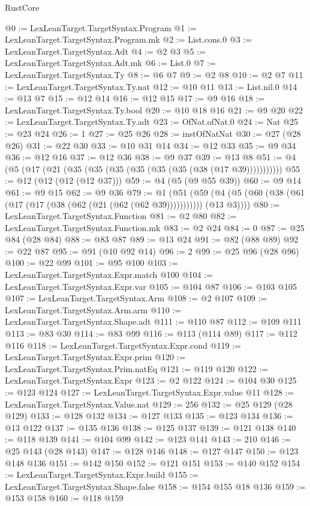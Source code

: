 \begin{lexlean}{RustCore}
\begin{coremodule}
@0 := LexLeanTarget.TargetSyntax.Program
@1 := LexLeanTarget.TargetSyntax.Program.mk
@2 := List.cons.{0}
@3 := LexLeanTarget.TargetSyntax.Adt
@4 := @2 @3
@5 := LexLeanTarget.TargetSyntax.Adt.mk
@6 := List.{0}
@7 := LexLeanTarget.TargetSyntax.Ty
@8 := @6 @7
@9 := @2 @8
@10 := @2 @7
@11 := LexLeanTarget.TargetSyntax.Ty.nat
@12 := @10 @11
@13 := List.nil.{0}
@14 := @13 @7
@15 := @12 @14
@16 := @12 @15
@17 := @9 @16
@18 := LexLeanTarget.TargetSyntax.Ty.bool
@20 := @10 @18 @16
@21 := @9 @20
@22 := LexLeanTarget.TargetSyntax.Ty.adt
@23 := OfNat.ofNat.{0}
@24 := Nat
@25 := @23 @24
@26 := 1
@27 := @25 @26
@28 := instOfNatNat
@30 := @27 (@28 @26)
@31 := @22 @30
@33 := @10 @31 @14
@34 := @12 @33
@35 := @9 @34
@36 := @12 @16
@37 := @12 @36
@38 := @9 @37
@39 := @13 @8
@51 := @4 (@5 (@17 (@21 (@35 (@35 (@35 (@35 (@35 (@35 (@38 (@17 @39)))))))))))
@55 := @12 (@12 (@12 (@12 @37)))
@59 := @4 (@5 (@9 @55 @39))
@60 := @9 @14
@61 := @9 @15
@62 := @9 @36
@79 := @1
    (@51 (@59 (@4 (@5 (@60 (@38 (@61 (@17 (@17 (@38 (@62 (@21 (@62 (@62 @39))))))))))) (@13 @3))))
@80 := LexLeanTarget.TargetSyntax.Function
@81 := @2 @80
@82 := LexLeanTarget.TargetSyntax.Function.mk
@83 := @2 @24
@84 := 0
@87 := @25 @84 (@28 @84)
@88 := @83 @87
@89 := @13 @24
@91 := @82 (@88 @89)
@92 := @22 @87
@95 := @91 (@10 @92 @14)
@96 := 2
@99 := @25 @96 (@28 @96)
@100 := @22 @99
@101 := @95 @100
@103 := LexLeanTarget.TargetSyntax.Expr.match @100
@104 := LexLeanTarget.TargetSyntax.Expr.var
@105 := @104 @87
@106 := @103 @105
@107 := LexLeanTarget.TargetSyntax.Arm
@108 := @2 @107
@109 := LexLeanTarget.TargetSyntax.Arm.arm
@110 := LexLeanTarget.TargetSyntax.Shape.adt
@111 := @110 @87
@112 := @109 @111
@113 := @83 @30
@114 := @83 @99
@116 := @113 (@114 @89)
@117 := @112 @116
@118 := LexLeanTarget.TargetSyntax.Expr.cond
@119 := LexLeanTarget.TargetSyntax.Expr.prim
@120 := LexLeanTarget.TargetSyntax.Prim.natEq
@121 := @119 @120
@122 := LexLeanTarget.TargetSyntax.Expr
@123 := @2 @122
@124 := @104 @30
@125 := @123 @124
@127 := LexLeanTarget.TargetSyntax.Expr.value @11
@128 := LexLeanTarget.TargetSyntax.Value.nat
@129 := 256
@132 := @25 @129 (@28 @129)
@133 := @128 @132
@134 := @127 @133
@135 := @123 @134
@136 := @13 @122
@137 := @135 @136
@138 := @125 @137
@139 := @121 @138
@140 := @118 @139
@141 := @104 @99
@142 := @123 @141
@143 := 210
@146 := @25 @143 (@28 @143)
@147 := @128 @146
@148 := @127 @147
@150 := @123 @148 @136
@151 := @142 @150
@152 := @121 @151
@153 := @140 @152
@154 := LexLeanTarget.TargetSyntax.Expr.build
@155 := LexLeanTarget.TargetSyntax.Shape.false
@158 := @154 @155 @18 @136
@159 := @153 @158
@160 := @118 @159

\end{coremodule}
\end{lexlean}
